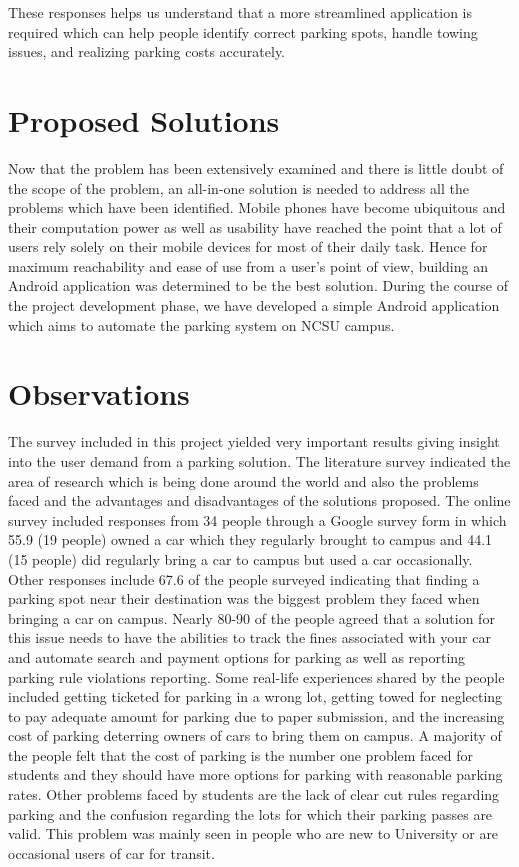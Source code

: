 \documentclass{acm_proc_article-sp}
\begin{document}
These responses helps us understand that a more streamlined application is required which can help people identify correct parking spots, handle towing issues, and realizing parking costs accurately.

\section{Proposed Solutions}
Now that the problem has been extensively examined and there is little doubt of the scope of the problem, an all-in-one solution is needed to address all the problems which have been identified. Mobile phones have become ubiquitous and their computation power as well as usability have reached the point that a lot of users rely solely on their mobile devices for most of their daily task. Hence for maximum reachability and ease of use from a user's point of view, building an Android application was determined to be the best solution. During the course of the project development phase, we have developed a simple Android application which aims to automate the parking system on NCSU campus.


\section{Observations}
The survey included in this project yielded very important results giving insight into the user demand from a parking solution. The literature survey indicated the area of research which is being done around the world and also the problems faced and the advantages and disadvantages of the solutions proposed. The online survey included responses from 34 people through a Google survey form\cite{gooform} in which 55.9\textsc{} (19 people) owned a car which they regularly brought to campus and 44.1\textsc{} (15 people) did regularly bring a car to campus but used a car occasionally. Other responses include 67.6\textsc{} of the people surveyed indicating that finding a parking spot near their destination was the biggest problem they faced when bringing a car on campus. Nearly 80\textsc{}-90\textsc{} of the people agreed that a solution for this issue needs to have the abilities to track the fines associated with your car and automate search and payment options for parking as well as reporting parking rule violations reporting. Some real-life experiences shared by the people included getting ticketed for parking in a wrong lot, getting towed for neglecting to pay adequate amount for parking due to paper submission, and the increasing cost of parking deterring owners of cars to bring them on campus. A majority of the people felt that the cost of parking is the number one problem faced for students and they should have more options for parking with reasonable parking rates. Other problems faced by students are the lack of clear cut rules regarding parking and the confusion regarding the lots for which their parking passes are valid. This problem was mainly seen in people who are new to University or are occasional users of car for transit.
\end{document}
